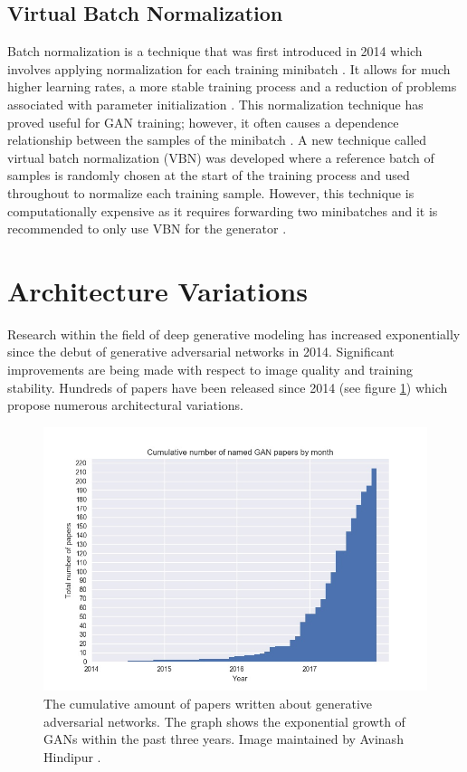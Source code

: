 \documentclass[11pt]{article}
\begin{document}
\subsection{Virtual Batch Normalization}
Batch normalization is a technique that was first introduced in 2014 which involves applying normalization for each training minibatch \citep{2015arXiv150203167I}. It allows for much higher learning rates, a more stable training process and a reduction of problems associated with parameter initialization \citep{2015arXiv150203167I}. This normalization technique has proved useful for GAN training; however, it often causes a dependence relationship between the samples of the minibatch \citep{2016arXiv160603498S}. A new technique called virtual batch normalization (VBN) was developed where a reference batch of samples is randomly chosen at the start of the training process and used throughout to normalize each training sample. However, this technique is computationally expensive as it requires forwarding two minibatches and it is recommended to only use VBN for the generator \citep{2016arXiv160603498S}.



\section{Architecture Variations}
Research within the field of deep generative modeling has increased exponentially since the debut of generative adversarial networks in 2014. Significant improvements are being made with respect to image quality and training stability. Hundreds of papers have been released since 2014 (see figure \ref{fig:CumulativeNumberofGANPapersbyMonth}) which propose numerous architectural variations.

\begin{figure}
\centering
\includegraphics[scale=0.43]{cumulative_gans}
\caption{The cumulative amount of papers written about generative adversarial networks. The graph shows the exponential growth of GANs within the past three years. Image maintained by Avinash Hindipur \citep{November2017GANZoo}.}
\label{fig:CumulativeNumberofGANPapersbyMonth}
\end{figure}
\end{document}
